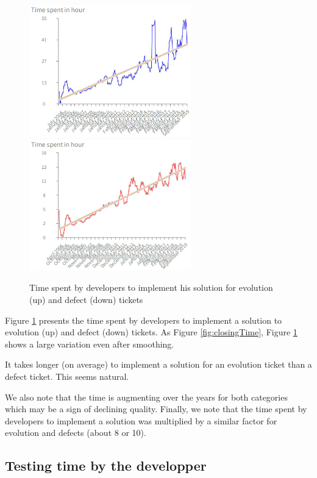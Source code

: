 \documentclass[10pt,conference]{IEEEtran}
\begin{document}

\begin{figure}[htbp]
  \centering
  \includegraphics[width=70mm]{./images/devEvol.png}\\
  \includegraphics[width=70mm]{./images/devDefect.png}
  \caption{Time spent by developers to implement his solution for  evolution (up) and defect (down) tickets}
  \label{fig:devTimeDev}
\end{figure}

Figure \ref{fig:devTimeDev} presents the time spent by developers to implement a solution to evolution (up) and defect (down) tickets.
As Figure \ref{fig:closingTime}, Figure \ref{fig:devTimeDev} shows a large variation even after smoothing.

It takes longer (on average) to implement a solution for an evolution ticket than a defect ticket. This seems natural.

We also note that the time is augmenting over the years for both categories which may be a sign of declining quality.
Finally, we note that the time spent by developers to implement a solution was multiplied by a similar factor for evolution and defects (about 8 or 10).


\subsection{Testing time by the developper}
\label{sec:testingTime}
\end{document}

